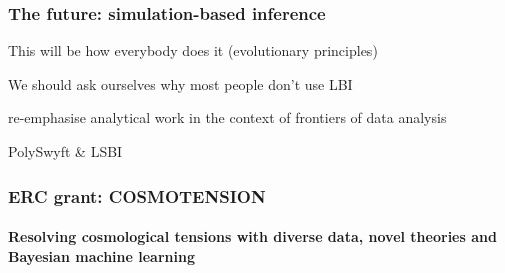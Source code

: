 \documentclass[aspectratio=169, handout]{beamer}
\begin{document}
\begin{frame}
    \frametitle{The future: simulation-based inference}

    This will be how everybody does it (evolutionary principles)

    We should ask ourselves why most people don't use LBI

    re-emphasise analytical work in the context of frontiers of data analysis

    PolySwyft \& LSBI
\end{frame}

\begin{frame}
    \frametitle{ERC grant: COSMOTENSION \hspace{95pt}\small \texttt{}}
    \framesubtitle{Resolving cosmological tensions with diverse data, novel theories and Bayesian machine learning}


\end{frame}
\end{document}
